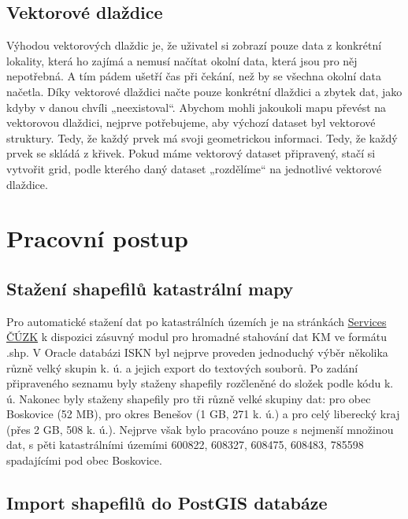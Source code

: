 \documentclass[12pt]{article}
\begin{document}
\subsection{Vektorové dlaždice}
Výhodou vektorových dlaždic je, že uživatel si zobrazí pouze data z konkrétní lokality, která ho zajímá a nemusí načítat okolní data, která jsou pro něj nepotřebná. A tím pádem ušetří čas při čekání, než by se všechna okolní data načetla. Díky vektorové dlaždici načte pouze konkrétní dlaždici a zbytek dat, jako kdyby v danou chvíli „neexistoval“.
Abychom mohli jakoukoli mapu převést na vektorovou dlaždici, nejprve potřebujeme, aby výchozí dataset byl vektorové struktury. Tedy, že každý prvek má svoji geometrickou informaci. Tedy, že každý prvek se skládá z křivek. Pokud máme vektorový dataset připravený, stačí si vytvořit grid, podle kterého daný dataset „rozdělíme“ na jednotlivé vektorové dlaždice.

\clearpage 
\section{Pracovní postup}

\subsection{Stažení shapefilů katastrální mapy} 
Pro automatické stažení dat po katastrálních územích je na stránkách \href{http://services.cuzk.cz/shp/ku/QGIS-plugin/QGIS_verze-3.x/}{Services ČÚZK} k dispozici zásuvný modul pro hromadné stahování dat KM ve formátu .shp. V Oracle databázi ISKN byl nejprve proveden jednoduchý výběr několika různě velký skupin k. ú. a jejich export do textových souborů. Po zadání připraveného seznamu byly staženy shapefily rozčleněné do složek podle kódu k. ú. Nakonec byly staženy shapefily pro tři různě velké skupiny dat:  pro obec Boskovice (52 MB), pro okres Benešov (1 GB, 271 k. ú.) a pro celý liberecký kraj (přes 2 GB, 508 k. ú.). Nejprve však bylo pracováno pouze s nejmenší množinou dat, s pěti katastrálními územími 600822, 608327, 608475, 608483, 785598 spadajícími pod obec Boskovice. 

\subsection{Import shapefilů do PostGIS databáze}
\end{document}

